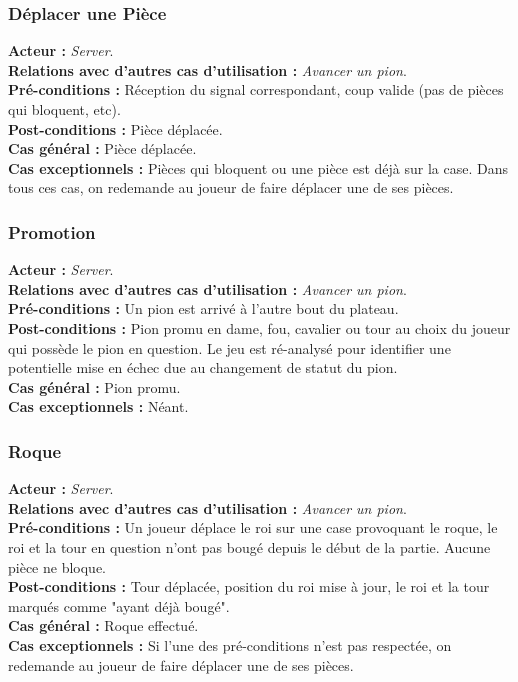 \documentclass[10pt, a4paper]{article}
\begin{document}
\subsubsection{Déplacer une Pièce}
\textbf{Acteur :} \textit{Server}. \\
\textbf{Relations avec d'autres cas d'utilisation :} {\itshape Avancer un pion}. \\
\textbf{Pré-conditions :} Réception du signal correspondant, coup valide (pas de pièces qui bloquent, etc). \\
\textbf{Post-conditions :} Pièce déplacée. \\
\textbf{Cas général :} Pièce déplacée. \\
\textbf{Cas exceptionnels :} Pièces qui bloquent ou une pièce est déjà sur la case. Dans tous ces cas, on redemande au joueur de faire déplacer une de ses pièces. \\

\subsubsection{Promotion}
\textbf{Acteur :} \textit{Server}. \\
\textbf{Relations avec d'autres cas d'utilisation :} {\itshape Avancer un pion}. \\
\textbf{Pré-conditions :} Un pion est arrivé à l'autre bout du plateau. \\
\textbf{Post-conditions :} Pion promu en dame, fou, cavalier ou tour au choix du joueur qui possède le pion en question. Le jeu est ré-analysé pour identifier une potentielle mise en échec due au changement de statut du pion. \\
\textbf{Cas général :} Pion promu. \\
\textbf{Cas exceptionnels :} Néant. \\

\subsubsection{Roque}
\textbf{Acteur :} \textit{Server}. \\
\textbf{Relations avec d'autres cas d'utilisation :} {\itshape Avancer un pion}. \\
\textbf{Pré-conditions :} Un joueur déplace le roi sur une case provoquant le roque, le roi et la tour en question n'ont pas bougé depuis le début de la partie. Aucune pièce ne bloque. \\
\textbf{Post-conditions :} Tour déplacée, position du roi mise à jour, le roi et la tour marqués comme "ayant déjà bougé". \\
\textbf{Cas général :} Roque effectué. \\
\textbf{Cas exceptionnels :} Si l'une des pré-conditions n'est pas respectée, on redemande au joueur de faire déplacer une de ses pièces. \\
\end{document}
